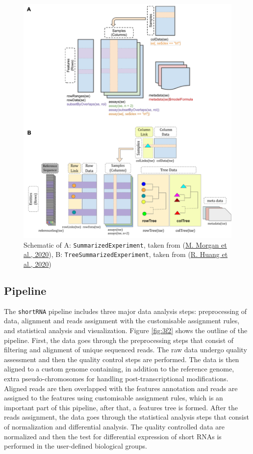 \documentclass[12pt,twoside]{reedthesis}
\begin{document}
\begin{figure}[htbp]

{\centering \includegraphics{thesis_files/figure-latex/3f1-1} 

}

\caption{Schematic of A: \texttt{SummarizedExperiment}, taken from (\protect\hyperlink{ref-morgan2020}{M. Morgan et al., 2020}), B: \texttt{TreeSummarizedExperiment}, taken from (\protect\hyperlink{ref-huang2020}{R. Huang et al., 2020})}\label{fig:3f1}
\end{figure}
\hypertarget{pipeline}{%
\subsection{Pipeline}\label{pipeline}}

The \texttt{shortRNA} pipeline includes three major data analysis steps:
preprocessing of data, alignment and reads assignment with the
customisable assignment rules, and statistical analysis and
visualization. Figure \ref{fig:3f2} shows the outline of the pipeline. First, the
data goes through the preprocessing steps that consist of filtering and
alignment of unique sequenced reads. The raw data undergo quality
assessment and then the quality control steps are performed. The data is
then aligned to a custom genome containing, in addition to the reference
genome, extra pseudo-chromosomes for handling post-transcriptional
modifications. Aligned reads are then overlapped with the features
annotation and reads are assigned to the features using customisable
assignment rules, which is an important part of this pipeline, after
that, a features tree is formed. After the reads assignment, the data
goes through the statistical analysis steps that consist of
normalization and differential analysis. The quality controlled data are
normalized and then the test for differential expression of short RNAs
is performed in the user-defined biological groups.
\end{document}
